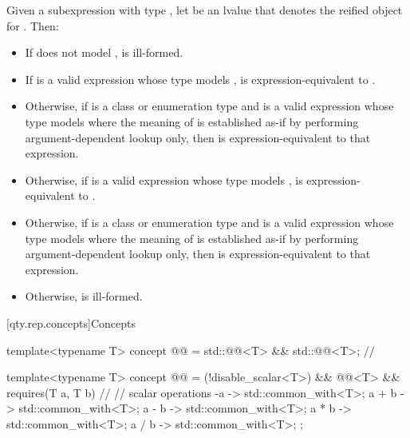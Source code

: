\pnum
Given a subexpression  with type ,
let  be an lvalue that denotes the reified object for .
Then:
\begin{itemize}
\item
If  does not model ,
 is ill-formed.
\item
If  is a valid expression whose type models ,
 is expression-equivalent to .
\item
Otherwise, if  is a class or enumeration type and
 is a valid expression whose type models 
where the meaning of  is established as-if by performing argument-dependent lookup only,
then  is expression-equivalent to that expression.
\item
Otherwise, if  is a valid expression whose type models ,
 is expression-equivalent to .
\item
Otherwise, if  is a class or enumeration type and
 is a valid expression whose type models 
where the meaning of  is established as-if by performing argument-dependent lookup only,
then  is expression-equivalent to that expression.
\item
Otherwise,  is ill-formed.
\end{itemize}

[qty.rep.concepts]{Concepts}

\begin{itemdecl}
template<typename T>
concept @@ = std::@@<T> && std::@@<T>;  // \expos

template<typename T>
concept @@ = (!disable_scalar<T>) && @@<T> && requires(T a, T b) {  // \expos
  // scalar operations
  { -a } -> std::common_with<T>;
  { a + b } -> std::common_with<T>;
  { a - b } -> std::common_with<T>;
  { a * b } -> std::common_with<T>;
  { a / b } -> std::common_with<T>;
};
\end{itemdecl}

